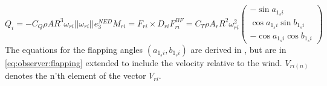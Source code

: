     \begin{subequations}
        \begin{equation}
            \label{eq:observer:torque}
            Q_{i} = -C_{Q} \rho A R^{3} \omega_{ri}||\omega_{ri}||e_{3}^{NED}
        \end{equation}

        \begin{equation}
            \label{eq:observer:thrustmomentum}
            M_{ri} = F_{ri} \times D_{ri}
        \end{equation}

        \begin{equation}
            \label{eq:observer:thrust}
            F_{ri}^{BF} = C_{T} \rho A_{r} R^{2} \omega_{ri}^{2}\left(
                \begin{array}{c}
                    -\sin{a_{1_{s}i}} \\
                    \cos{a_{1_{s}i}}\sin{b_{1_{s}i}} \\
                    -\cos{a_{1_{s}i}}\cos{b_{1_{s}i}}
                \end{array}\right)
        \end{equation}
    \end{subequations}
    The equations for the flapping angles $\left(a_{1_{s}i}, b_{1_{s}i}\right)$ are
    derived in \citep{Pounds_modellingand,prouty1995helicopter,leishman2002principles},
    but are in \eqref{eq:observer:flapping} extended to include the velocity relative to the wind.
    $V_{ri(n)}$ denotes the n'th element of the vector $V_{ri}$.

